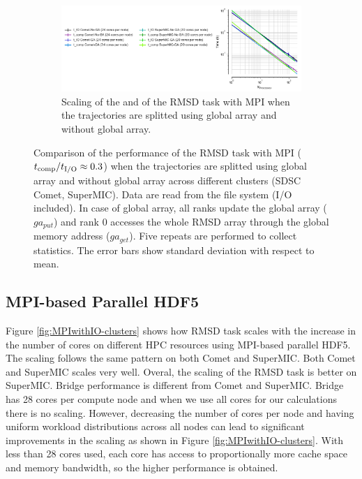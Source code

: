 \begin{figure}[ht!]
\begin{subfigure} {.8\textwidth}
  \includegraphics[width=\linewidth]{figures/Clusters_IO_compute_scaling_splitting.pdf}
  \caption{Scaling of the \tcomp and \tIO of the RMSD task with MPI when the trajectories are splitted using global array and without global array.}
  \label{fig:compute-IO-scaling-clusters-splitting}
\end{subfigure}
%
\caption{Comparison of the performance of the RMSD task with MPI (${t}_{\text{comp}}/{t}_{\text{I/O}} \approx 0.3$) when the trajectories are splitted using global 
array and without global array across different clusters (SDSC Comet, SuperMIC). Data are read from the file system (I/O included).
In case of global array, all ranks update the global array ($ga_{put}$) and rank 0 accesses the whole RMSD array through the global memory address ($ga_{get}$).
Five repeats are performed to collect statistics. The error bars show standard deviation with respect to mean. }
\label{fig:MPI-splitting-clusters}
\end{figure} 

\subsection{MPI-based Parallel HDF5}
Figure \ref{fig:MPIwithIO-clusters} shows how RMSD task scales with the increase in the number of cores on different HPC resources using MPI-based parallel HDF5.  
The scaling follows the same pattern on both Comet and SuperMIC. 
Both Comet and SuperMIC scales very well.
Overal, the scaling of the RMSD task is better on SuperMIC.
Bridge performance is different from Comet and SuperMIC.
Bridge has 28 cores per compute node and when we use all cores for our calculations there is no scaling.
However, decreasing the number of cores per node and having uniform workload distributions across all nodes can lead to significant improvements in the scaling as shown in Figure \ref{fig:MPIwithIO-clusters}.
With less than 28 cores used, each core has access to proportionally more cache space and memory bandwidth, so the higher performance is obtained. 

